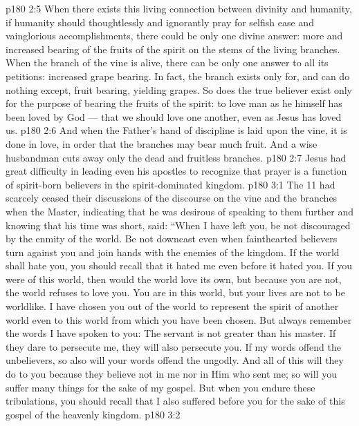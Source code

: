 \vs p180 2:5 When there exists this living connection between divinity and humanity, if humanity should thoughtlessly and ignorantly pray for selfish ease and vainglorious accomplishments, there could be only one divine answer: more and increased bearing of the fruits of the spirit on the stems of the living branches. When the branch of the vine is alive, there can be only one answer to all its petitions: increased grape bearing. In fact, the branch exists only for, and can do nothing except, fruit bearing, yielding grapes. So does the true believer exist only for the purpose of bearing the fruits of the spirit: to love man as he himself has been loved by God --- that we should love one another, even as Jesus has loved us.
\vs p180 2:6 And when the Father’s hand of discipline is laid upon the vine, it is done in love, in order that the branches may bear much fruit. And a wise husbandman cuts away only the dead and fruitless branches.
\vs p180 2:7 Jesus had great difficulty in leading even his apostles to recognize that prayer is a function of spirit\hyp{}born believers in the spirit\hyp{}dominated kingdom.
\vs p180 3:1 The 11 had scarcely ceased their discussions of the discourse on the vine and the branches when the Master, indicating that he was desirous of speaking to them further and knowing that his time was short, said: “When I have left you, be not discouraged by the enmity of the world. Be not downcast even when fainthearted believers turn against you and join hands with the enemies of the kingdom. If the world shall hate you, you should recall that it hated me even before it hated you. If you were of this world, then would the world love its own, but because you are not, the world refuses to love you. You are in this world, but your lives are not to be worldlike. I have chosen you out of the world to represent the spirit of another world even to this world from which you have been chosen. But always remember the words I have spoken to you: The servant is not greater than his master. If they dare to persecute me, they will also persecute you. If my words offend the unbelievers, so also will your words offend the ungodly. And all of this will they do to you because they believe not in me nor in Him who sent me; so will you suffer many things for the sake of my gospel. But when you endure these tribulations, you should recall that I also suffered before you for the sake of this gospel of the heavenly kingdom.
\vs p180 3:2 
